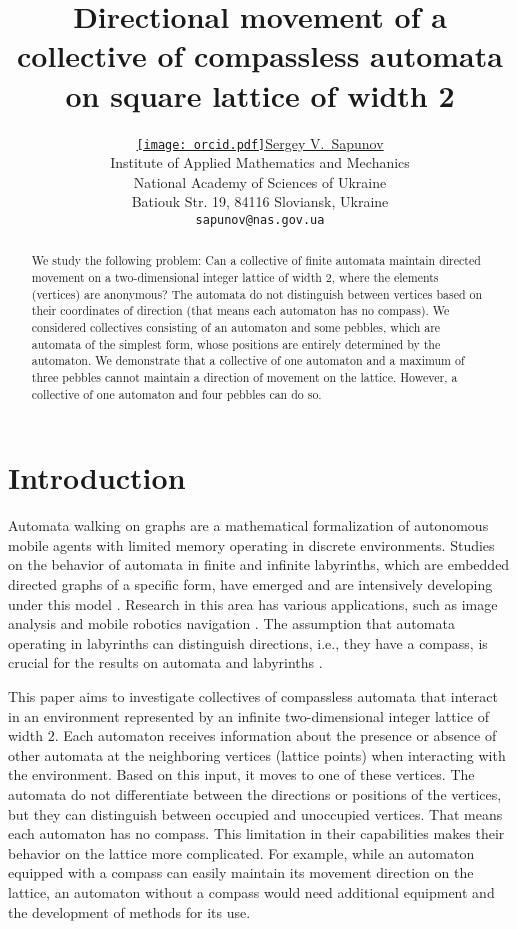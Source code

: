 \documentclass{article}
\title{Directional movement of a collective of compassless automata on square lattice of width 2}
\author{ \href{https://orcid.org/0000-0001-6435-819X}{\texttt{[image: orcid.pdf]}\hspace{1mm}Sergey V.~Sapunov} \\
	Institute of Applied Mathematics and Mechanics\\
	National Academy of Sciences of Ukraine\\
	Batiouk Str. 19, 84116 Sloviansk, Ukraine\\
	\texttt{sapunov@nas.gov.ua} \\
}
\begin{document}
\maketitle

\begin{abstract}
We study the following problem: Can a collective of finite automata maintain directed movement on a two-dimensional integer lattice of width 2, where the elements (vertices) are anonymous? 
The automata do not distinguish between vertices based on their coordinates of direction (that means each automaton has no compass).
We considered collectives consisting of an automaton and some pebbles, which are automata of the simplest form, whose positions are entirely determined by the automaton.
We demonstrate that a collective of one automaton and a maximum of three pebbles cannot maintain a direction of movement on the lattice. 
However, a collective of one automaton and four pebbles can do so.
\end{abstract}


\section{Introduction}
Automata walking on graphs are a mathematical formalization of autonomous mobile agents with limited memory operating in discrete environments.
Studies on the behavior of automata in finite and infinite labyrinths, which are embedded directed graphs of a specific form, have emerged and are intensively developing under this model \cite{Hemmerling1989, Kilibarda2003, Kilibarda2003a}.
Research in this area has various applications, such as image analysis \cite{Kari2006, Stamatovic2017} and mobile robotics navigation \cite{Dudek2010}.
The assumption that automata operating in labyrinths can distinguish directions, i.e., they have a compass, is crucial for the results on automata and labyrinths \cite{Blum1978, Donald2012}.

This paper aims to investigate collectives of compassless automata that interact in an environment represented by an infinite two-dimensional integer lattice of width $2$.
Each automaton receives information about the presence or absence of other automata at the neighboring vertices (lattice points) when interacting with the environment. Based on this input, it moves to one of these vertices.
The automata do not differentiate between the directions or positions of the vertices, but they can distinguish between occupied and unoccupied vertices.
That means each automaton has no compass. 
This limitation in their capabilities makes their behavior on the lattice more complicated.
For example, while an automaton equipped with a compass can easily maintain its movement direction on the lattice, an automaton without a compass would need additional equipment and the development of methods for its use.
\end{document}
